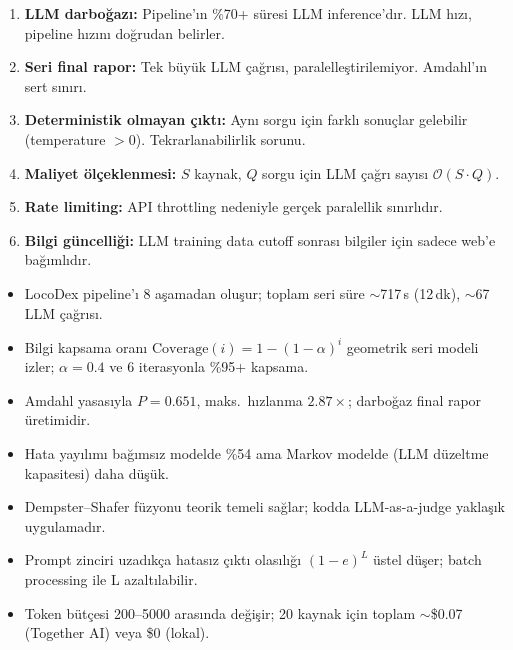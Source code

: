 \begin{enumerate}
  \item \textbf{LLM darbo\u{g}az{\i}:} Pipeline'{\i}n \%70+ s\"{u}resi LLM inference'd{\i}r. LLM h{\i}z{\i}, pipeline h{\i}z{\i}n{\i} do\u{g}rudan belirler.
  \item \textbf{Seri final rapor:} Tek b\"{u}y\"{u}k LLM \c{c}a\u{g}r{\i}s{\i}, paralelle\c{s}tirilemiyor. Amdahl'{\i}n sert s{\i}n{\i}r{\i}.
  \item \textbf{Deterministik olmayan \c{c}{\i}kt{\i}:} Ayn{\i} sorgu i\c{c}in farkl{\i} sonu\c{c}lar gelebilir (temperature $> 0$). Tekrarlanabilirlik sorunu.
  \item \textbf{Maliyet \"{o}l\c{c}eklenmesi:} $S$ kaynak, $Q$ sorgu i\c{c}in LLM \c{c}a\u{g}r{\i} say{\i}s{\i} $\mathcal{O}(S \cdot Q)$.
  \item \textbf{Rate limiting:} API throttling nedeniyle ger\c{c}ek paralellik s{\i}n{\i}rl{\i}d{\i}r.
  \item \textbf{Bilgi g\"{u}ncelli\u{g}i:} LLM training data cutoff sonras{\i} bilgiler i\c{c}in sadece web'e ba\u{g}{\i}ml{\i}d{\i}r.
\end{enumerate}


\begin{ozet}
\begin{itemize}[leftmargin=1.5em]
  \item LocoDex pipeline'{\i} 8 a\c{s}amadan olu\c{s}ur; toplam seri s\"{u}re $\sim$717\,s (12\,dk), $\sim$67 LLM \c{c}a\u{g}r{\i}s{\i}.
  \item Bilgi kapsama oran{\i} $\text{Coverage}(i) = 1 - (1-\alpha)^i$ geometrik seri modeli izler; $\alpha = 0.4$ ve 6 iterasyonla \%95+ kapsama.
  \item Amdahl yasas{\i}yla $P = 0.651$, maks.\ h{\i}zlanma $2.87\times$; darbo\u{g}az final rapor \"{u}retimidir.
  \item Hata yay{\i}l{\i}m{\i} ba\u{g}{\i}ms{\i}z modelde \%54 ama Markov modelde (LLM d\"{u}zeltme kapasitesi) daha d\"{u}\c{s}\"{u}k.
  \item Dempster--Shafer f\"{u}zyonu teorik temeli sa\u{g}lar; kodda LLM-as-a-judge yakla\c{s}{\i}k uygulamad{\i}r.
  \item Prompt zinciri uzad{\i}k\c{c}a hatas{\i}z \c{c}{\i}kt{\i} olas{\i}l{\i}\u{g}{\i} $(1-e)^L$ \"{u}stel d\"{u}\c{s}er; batch processing ile L azalt{\i}labilir.
  \item Token b\"{u}t\c{c}esi 200--5000 aras{\i}nda de\u{g}i\c{s}ir; 20 kaynak i\c{c}in toplam $\sim$\$0.07 (Together AI) veya \$0 (lokal).
\end{itemize}
\end{ozet}
